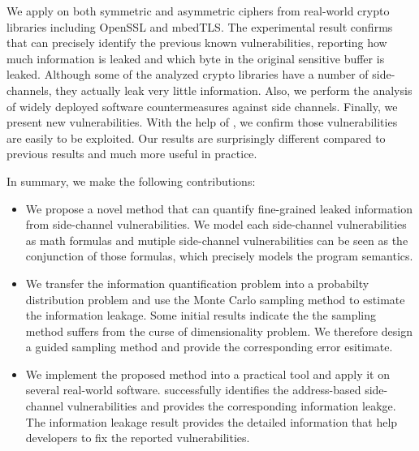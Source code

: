 We apply \tool{} on both symmetric and asymmetric ciphers from real-world crypto libraries including OpenSSL and
mbedTLS. The experimental result confirms that \tool{} can precisely identify the previous known vulnerabilities,
reporting how much information is leaked and which byte in the original sensitive buffer is leaked. 
Although some of the analyzed crypto libraries have a number of side-channels, they actually
leak very little information. Also, we perform the analysis of widely deployed software countermeasures
against side channels.
Finally, we present new vulnerabilities. With the help of \tool{}, we confirm those
vulnerabilities are easily to be exploited. Our results are surprisingly different compared to previous results
and much more useful in practice.

In summary, we make the following contributions:

\begin{itemize}
	\item We propose a novel method that can quantify fine-grained leaked information from side-channel
        vulnerabilities. We model each side-channel vulnerabilities as math formulas and 
        mutiple side-channel vulnerabilities can be seen as the conjunction of those formulas, which
        precisely models the program semantics.
        \item We transfer the information quantification problem into a probabilty distribution problem and 
        use the Monte Carlo sampling method to estimate the information leakage. Some initial results indicate the 
        the sampling method suffers from the curse of dimensionality problem. We therefore design a guided
        sampling method and provide the corresponding error esitimate.
	\item We implement the proposed method into a practical tool and apply it on several real-world software. \tool{} 
        successfully identifies the address-based side-channel vulnerabilities and provides the corresponding
        information leakge. The information leakage result provides the detailed information that help developers to
        fix the reported vulnerabilities.
\end{itemize}
